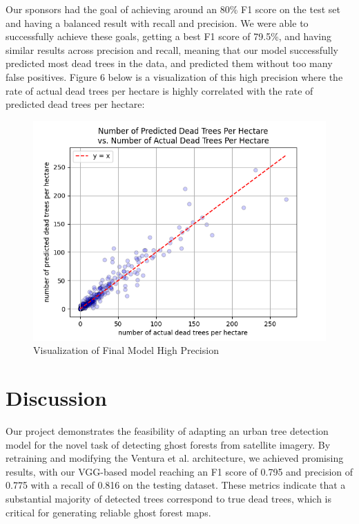 \documentclass[conference]{ieeetran}
\begin{document}
Our sponsors had the goal of achieving around an 80\% F1 score on the test set and having a balanced result with recall and precision. We were able to successfully achieve these goals, getting a best F1 score of 79.5\%, and having similar results across precision and recall, meaning that our model successfully predicted most dead trees in the data, and predicted them without too many false positives. Figure 6 below is a visualization of this high precision where the rate of actual dead trees per hectare is highly correlated with the rate of predicted dead trees per hectare:

\begin{figure}[htbp]
  \centering
  \includegraphics[width=\linewidth]{scatter_plot.png}
  \caption{Visualization of Final Model High Precision}
  \label{fig:my_label}
\end{figure}
\FloatBarrier




\section{Discussion}
Our project demonstrates the feasibility of adapting an urban tree detection model for the novel task of detecting ghost forests from satellite imagery. By retraining and modifying the Ventura et al. architecture, we achieved promising results, with our VGG-based model reaching an F1 score of 0.795 and precision of 0.775 with a recall of 0.816 on the testing dataset. These metrics indicate that a substantial majority of detected trees correspond to true dead trees, which is critical for generating reliable ghost forest maps. 
\end{document}
